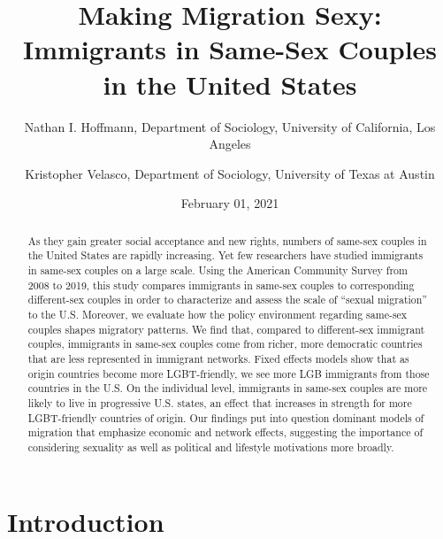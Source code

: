 \documentclass[
  11pt,
]{article}
\title{Making Migration Sexy: Immigrants in Same-Sex Couples in the United States}
\author{Nathan I. Hoffmann, Department of Sociology, University of California, Los Angeles \and Kristopher Velasco, Department of Sociology, University of Texas at Austin}
\date{February 01, 2021}
\begin{document}
\maketitle
\begin{abstract}
As they gain greater social acceptance and new rights, numbers of same-sex couples in the United States are rapidly increasing. Yet few researchers have studied immigrants in same-sex couples on a large scale. Using the American Community Survey from 2008 to 2019, this study compares immigrants in same-sex couples to corresponding different-sex couples in order to characterize and assess the scale of ``sexual migration'' to the U.S. Moreover, we evaluate how the policy environment regarding same-sex couples shapes migratory patterns. We find that, compared to different-sex immigrant couples, immigrants in same-sex couples come from richer, more democratic countries that are less represented in immigrant networks. Fixed effects models show that as origin countries become more LGBT-friendly, we see more LGB immigrants from those countries in the U.S. On the individual level, immigrants in same-sex couples are more likely to live in progressive U.S. states, an effect that increases in strength for more LGBT-friendly countries of origin. Our findings put into question dominant models of migration that emphasize economic and network effects, suggesting the importance of considering sexuality as well as political and lifestyle motivations more broadly.
\end{abstract}

\hypertarget{introduction}{%
\section{Introduction}\label{introduction}}
\end{document}
